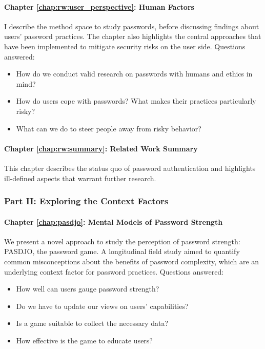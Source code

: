 \paragraph{Chapter \ref{chap:rw:user_perspective}: Human Factors} %
I describe the method space to study passwords, before discussing findings about users' password practices. The chapter also highlights the central approaches that have been implemented to mitigate security risks on the user side. 
Questions answered: \vspace*{-5pt} \begin{itemize}[leftmargin=*,itemsep=-5pt]
	\item How do we conduct valid research on passwords with humans and ethics in mind?
	\item How do users cope with passwords? What makes their practices particularly risky?
	\item What can we do to steer people away from risky behavior? 
\end{itemize}

\paragraph{Chapter \ref{chap:rw:summary}: Related Work Summary} This chapter describes the status quo of password authentication and highlights ill-defined aspects that warrant further research.


\subsubsection{Part II: Exploring the Context Factors}
\paragraph{Chapter \ref{chap:pasdjo}: Mental Models of Password Strength} %
We present a novel approach to study the perception of password strength: PASDJO, the password game. A longitudinal field study aimed to quantify common misconceptions about the benefits of password complexity, which are an underlying context factor for password practices. 
Questions answered: \vspace*{-5pt} \begin{itemize}[leftmargin=*,itemsep=-5pt]
	\item How well can users gauge password strength? 
	\item Do we have to update our views on users' capabilities?
	\item Is a game suitable to collect the necessary data?
	\item How effective is the game to educate users?
\end{itemize}


